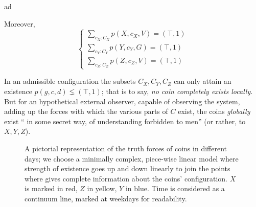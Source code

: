 \begin{example}
\begin{definition}
\begin{enumtag}{ad}
      \item \label{ad:due} Moreover,
      \[
        \begin{cases}
          \sum_{c_X: C_X} p(X,c_X,V) = (\top,1) \\
          \sum_{c_Y: C_Y} p(Y,c_Y,G) = (\top,1) \\
          \sum_{c_Z: C_Z} p(Z,c_Z,V) = (\top,1)
        \end{cases}
      \]
    \end{enumtag}
  \end{definition}
  In an admissible configuration the subsets $ C_X, C_Y, C_Z $ can only attain an existence $p(g,c,d) \lneq (\top,1)$; that is to say, \emph{no coin completely exists locally}. But for an hypothetical external observer, capable of observing the system, adding up the forces with which the various parts of $C$ exist, the coins \emph{globally} exist `` in some secret way, of understanding forbidden to men'' (or rather, to $ X, Y, Z $).
  \begin{center}
    \begin{figure}[h]
      \caption{A pictorial representation of the truth forces of coins in different days; we choose a minimally complex, piece-wise linear model where strength of existence goes up and down linearly to join the points where \cite{tlonEN} gives complete information about the coins' configuration. $X$ is marked in red, $Z$ in yellow, $Y$ in blue. Time is considered as a continuum line, marked at weekdays for readability.}
      \label{fig_coins}
    \end{figure}
  \end{center}
\end{example}

